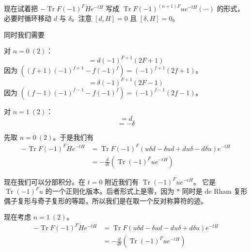 现在试着把 $-\operatorname{Tr}F(-1)^F\dot H e^{-tH}$ 写成
$\operatorname{Tr}F(-1)^{(n+1)F}ue^{-tH}(\cdots)$ 的形式，必要时循环移动 $d$ 与 $\delta$。注意 $[d,H] = 0$ 且 $[\delta,H] = 0$。

同时我们需要

对 $n = 0\ (2)$：
\begin{equation}
  [F(-1)^F, d] = d(-1)^{F+1}(2F+1)
  \tag{F.15}
  \label{eq:F.15}
\end{equation}
因为 $\left((f+1)(-1)^{f+1} - f(-1)^f\right) = (-1)^{f+1}(2f+1)$。
\begin{equation}
  [F(-1)^F, \delta] = \delta(-1)^{F+1}(2F-1)
  \tag{F.16}
  \label{eq:F.16}
\end{equation}
因为 $\left((f-1)(-1)^{f-1} - f(-1)^f\right) = (-1)^{f-1}(2f-1)$。

对 $n = 1\ (2)$：
\begin{equation}
  [F, d] = d
  \tag{F.17}
  \label{eq:F.17}
\end{equation}
\begin{equation}
  [F, \delta] = -\delta
  \tag{F.18}
  \label{eq:F.18}
\end{equation}

先取 $n = 0\ (2)$。于是我们有
\begin{equation}
\begin{aligned}
  -\operatorname{Tr}F(-1)^F\dot H e^{-tH}
  &= \operatorname{Tr}F(-1)^F\left(u\delta d - \delta u d + du\delta - d\delta u\right)e^{-tH}\\
  &= -\frac{d}{dt}\left(\operatorname{Tr}(-1)^F u e^{-tH}\right)
\end{aligned}
\tag{F.19}
\label{eq:F.19}
\end{equation}


现在我们可以分部积分。在 $t = 0$ 附近我们有 $\operatorname{Tr}(-1)^F u e^{-\epsilon H}$。
它是 $\operatorname{Tr}(-1)^F u$ 的一个正则化版本。后者形式上是零，因为 $*$ 同时是 de Rham 复形偶子复形与奇子复形的等距，所以我们是在取一个反对称算符的迹。

现在考虑 $n = 1\ (2)$。
\begin{equation}
\begin{aligned}
  -\operatorname{Tr}F(-1)^F\dot H e^{-tH}
  &= \operatorname{Tr}F\left(u\delta d - \delta u d - du\delta + d\delta u\right)e^{-tH}\\
  &= -\frac{d}{dt}\left(\operatorname{Tr}(-1)^F u e^{-tH}\right)
\end{aligned}
\tag{F.20}
\label{eq:F.20}
\end{equation}

